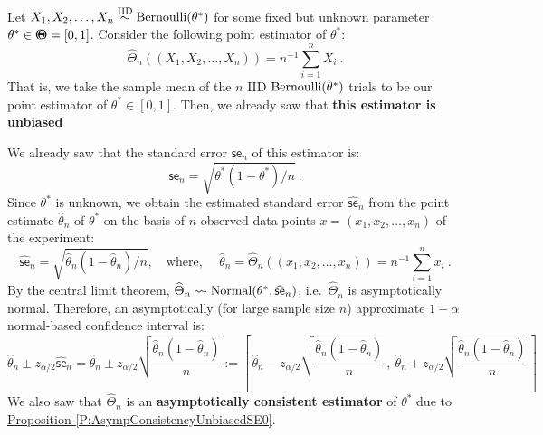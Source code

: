 \begin{example}\label{EX:EstimatePFromNIIDBernoulliTrials}
Let $X_1,X_2,\ldots,X_n \overset{{\rm IID}}{\sim} \mbox{{\rm Bernoulli}}(\theta^*)$ for some fixed but unknown parameter $\theta^* \in {\Theta}\mspace{-11 mu}{\Theta}=[0,1]$.  Consider the following point estimator of $\theta^*$:
\[
\widehat{\Theta}_n((X_1,X_2,\ldots,X_n)) = n^{-1} \sum_{i=1}^n X_i \ .
\]
That is, we take the sample mean of the $n$ IID $\mbox{{\rm Bernoulli}}(\theta^*)$ trials to be our point estimator of $\theta^*\in[0,1]$.  Then, we already saw that {\bf this estimator is unbiased}

We already saw that the standard error  $\mathsf{se}_n$ of this estimator is:
\[
\mathsf{se}_n=\sqrt{{\theta^*}(1-{\theta^*})/n} \ .
\]
Since ${\theta^*}$ is unknown, we obtain the estimated standard error $\widehat{\mathsf{se}}_n$ from the point estimate $\widehat{\theta}_n$ of ${\theta^*}$ on the basis of $n$ observed data points $x=(x_1,x_2,\ldots,x_n)$ of the experiment:
\[
\widehat{\mathsf{se}}_n = \sqrt{\widehat{\theta}_n(1-\widehat{\theta}_n)/n}, \quad \text{where, } \quad \widehat{\theta}_n=\widehat{\Theta}_n((x_1,x_2,\ldots,x_n))=n^{-1}\sum_{i=1}^n x_i \ .
\]
By the central limit theorem, $\widehat{\Theta}_n \rightsquigarrow \mbox{{\rm Normal}}(\theta^*,\widehat{\mathsf{se}}_n)$, i.e.~$\widehat{\Theta}_n$ is asymptotically normal.  Therefore, an asymptotically (for large sample size $n$) approximate $1-\alpha$ normal-based confidence interval is:
\[
\widehat{\theta}_n \pm z_{\alpha/2} \widehat{\mathsf{se}}_n 
= \widehat{\theta}_n \pm z_{\alpha/2} \sqrt{\frac{ \widehat{\theta}_n (1- \widehat{\theta}_n )}{n}}
:= \left[ \, \widehat{\theta}_n - z_{\alpha/2} \sqrt{\frac{ \widehat{\theta}_n (1- \widehat{\theta}_n )}{n}} \ , \ \widehat{\theta}_n + z_{\alpha/2} \sqrt{\frac{ \widehat{\theta}_n (1- \widehat{\theta}_n )}{n}} \, \right]
\]
We also saw that $\widehat{\Theta}_n$ is an {\bf asymptotically consistent estimator} of $\theta^*$  due to \hyperref[P:AsympConsistencyUnbiasedSE0]{Proposition \ref*{P:AsympConsistencyUnbiasedSE0}}.


\end{example}

